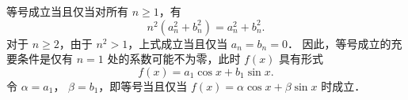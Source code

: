 \begin{myproof}
    等号成立当且仅当对所有 $n \geqslant 1$，有
    \begin{equation}
        n^2 (a_n^2 + b_n^2) = a_n^2 + b_n^2.
    \end{equation}
    对于 $n \geqslant 2$，由于 $n^2 > 1$，上式成立当且仅当 $a_n = b_n = 0$．
    因此，等号成立的充要条件是仅有 $n=1$ 处的系数可能不为零，此时 $f(x)$ 具有形式
    \begin{equation}
        f(x) = a_1 \cos x + b_1 \sin x.
    \end{equation}
    令 $\alpha = a_1$， $\beta = b_1$，即等号当且仅当 $f(x) = \alpha \cos x + \beta \sin x$ 时成立．
\end{myproof}

\endinput
